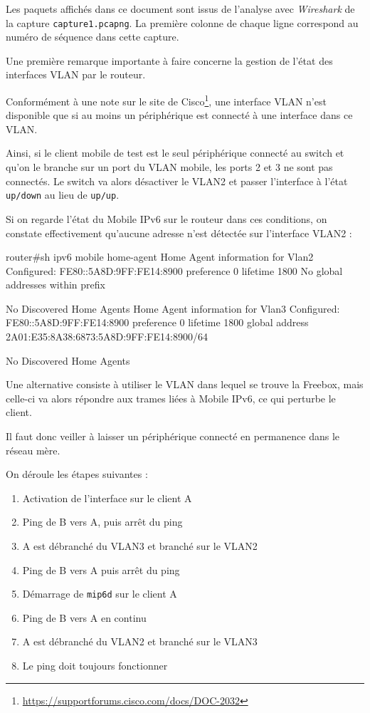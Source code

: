 Les paquets affichés dans ce document sont issus de l'analyse avec \emph{Wireshark} de la capture \texttt{capture1.pcapng}.
La première colonne de chaque ligne correspond au numéro de séquence dans cette capture.

\begin{warning}
Une première remarque importante à faire concerne la gestion de l'état des interfaces VLAN par le routeur.

Conformément à une note sur le site de Cisco\footnote{\url{https://supportforums.cisco.com/docs/DOC-2032}}, une interface VLAN n'est disponible que si au moins un périphérique est connecté à une interface dans ce VLAN.

Ainsi, si le client mobile de test est le seul périphérique connecté au switch et qu'on le branche sur un port du VLAN mobile, les ports 2 et 3 ne sont pas connectés.
Le switch va alors désactiver le VLAN2 et passer l'interface à l'état \texttt{up/down} au lieu de \texttt{up/up}.

Si on regarde l'état du Mobile IPv6 sur le routeur dans ces conditions, on constate effectivement qu'aucune adresse n'est détectée sur l'interface VLAN2 :
\begin{code}
router#sh ipv6 mobile home-agent
Home Agent information for Vlan2
  Configured:
    FE80::5A8D:9FF:FE14:8900
    preference 0 lifetime 1800
      No global addresses within prefix

  No Discovered Home Agents
Home Agent information for Vlan3
  Configured:
    FE80::5A8D:9FF:FE14:8900
    preference 0 lifetime 1800
      global address 2A01:E35:8A38:6873:5A8D:9FF:FE14:8900/64

  No Discovered Home Agents
\end{code}

Une alternative consiste à utiliser le VLAN dans lequel se trouve la Freebox, mais celle-ci va alors répondre aux trames liées à Mobile IPv6, ce qui perturbe le client.

Il faut donc veiller à laisser un périphérique connecté en permanence dans le réseau mère.
\end{warning}

On déroule les étapes suivantes :

\begin{enumerate}
\item Activation de l'interface sur le client A
\item Ping de B vers A, puis arrêt du ping
\item A est débranché du VLAN3 et branché sur le VLAN2
\item Ping de B vers A puis arrêt du ping
\item Démarrage de \texttt{mip6d} sur le client A
\item Ping de B vers A en continu
\item A est débranché du VLAN2 et branché sur le VLAN3
\item Le ping doit toujours fonctionner
\end{enumerate}

